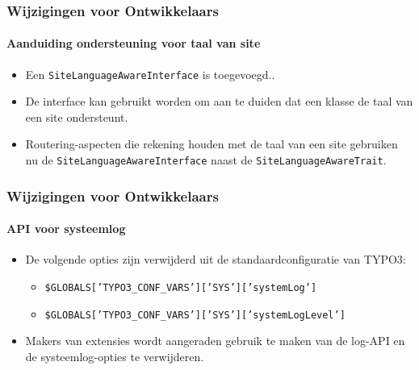 
\begin{frame}[fragile]
	\frametitle{Wijzigingen voor Ontwikkelaars}
	\framesubtitle{Aanduiding ondersteuning voor taal van site}

	\lstset{basicstyle=\tiny\ttfamily}


	\begin{itemize}
		\item Een \texttt{SiteLanguageAwareInterface} is toegevoegd..
		\item De interface kan gebruikt worden om aan te duiden dat een klasse de taal
			van een site ondersteunt.
		\item Routering-aspecten die rekening houden met de taal van een site
			gebruiken nu de \texttt{SiteLanguageAwareInterface} naast
			de \texttt{SiteLanguageAwareTrait}.
	\end{itemize}

\end{frame}


\begin{frame}[fragile]
	\frametitle{Wijzigingen voor Ontwikkelaars}
	\framesubtitle{API voor systeemlog}

	\lstset{basicstyle=\tiny\ttfamily}

	\begin{itemize}
		\item De volgende opties zijn verwijderd uit de standaardconfiguratie van TYPO3:

			\begin{itemize}\smaller
				\item \texttt{\$GLOBALS['TYPO3\_CONF\_VARS']['SYS']['systemLog']}
				\item \texttt{\$GLOBALS['TYPO3\_CONF\_VARS']['SYS']['systemLogLevel']}
			\end{itemize}\normalsize

		\item Makers van extensies wordt aangeraden gebruik te maken van de log-API en de systeemlog-opties te verwijderen.
	\end{itemize}

\end{frame}

